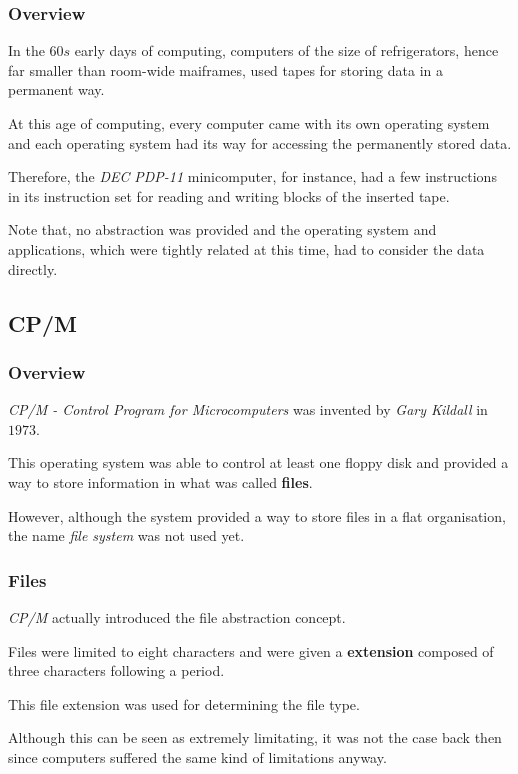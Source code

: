 
\begin{frame}
  \frametitle{Overview}

  In the $60s$ early days of computing, computers of the size of refrigerators,
  hence far smaller than room-wide maiframes, used tapes for storing
  data in a permanent way.

  \-

  At this age of computing, every computer came with its own operating system
  and each operating system had its way for accessing the permanently stored
  data.

  \-

  Therefore, the \textit{DEC} \textit{PDP-11} minicomputer, for instance,
  had a few instructions in its instruction set for reading and writing blocks
  of the inserted tape.

  \-

  Note that, no abstraction was provided and the operating system and
  applications, which were tightly related at this time, had to consider
  the data directly.
\end{frame}


\subsection{CP/M}


\begin{frame}
  \frametitle{Overview}

  \textit{CP/M - Control Program for Microcomputers} was invented by
  \textit{Gary Kildall} in $1973$.

  \-

  This operating system was able to control at least one floppy disk
  and provided a way to store information in what was called \textbf{files}.

  \-

  However, although the system provided a way to store files in a flat
  organisation, the name \textit{file system} was not used yet.
\end{frame}


\begin{frame}
  \frametitle{Files}

  \textit{CP/M} actually introduced the file abstraction concept.

  \-

  Files were limited to eight characters and were given a \textbf{extension}
  composed of three characters following a period.

  \-

  This file extension was used for determining the file type.

  \-

  Although this can be seen as extremely limitating, it was not the case
  back then since computers suffered the same kind of limitations anyway.
\end{frame}

